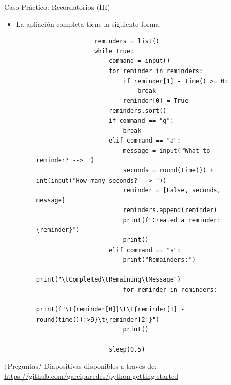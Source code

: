 \documentclass{beamer}
\begin{document}
    \begin{frame}[fragile]{Caso Práctico: Recordatorios (III)}
      \begin{itemize}
        \item La apliación completa tiene la siguiente forma:
        \begin{figure}
            \begin{minipage}[c]{\textwidth}
                \begin{verbatim}
                reminders = list()
                while True:
                    command = input()
                    for reminder in reminders:
                        if reminder[1] - time() >= 0:
                            break
                        reminder[0] = True
                    reminders.sort()
                    if command == "q":
                        break
                    elif command == "a":
                        message = input("What to reminder? --> ")
                        seconds = round(time()) + int(input("How many seconds? --> "))
                        reminder = [False, seconds, message]
                        reminders.append(reminder)
                        print(f"Created a reminder: {reminder}")
                        print()
                    elif command == "s":
                        print("Remainders:")
                        print("\tCompleted\tRemaining\tMessage")
                        for reminder in reminders:
                            print(f"\t{reminder[0]}\t\t{reminder[1] - round(time()):>9}\t{reminder[2]}")
                        print()

                    sleep(0.5)
                \end{verbatim}
            \end{minipage}
        \end{figure}
      \end{itemize}
    \end{frame}

    \begin{frame}
        \begin{center}
            {\Huge ¿Preguntas?}
            \vfill
            Diapositivas disponibles a través de:
            \\
            {\small\url{https://github.com/garciparedes/python-getting-started}}
        \end{center}
    \end{frame}
\end{document}
